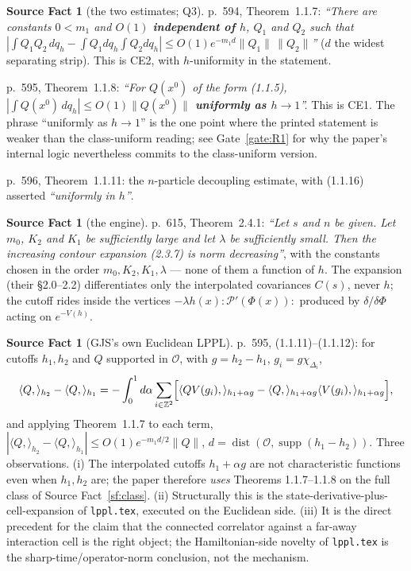 \documentclass[11pt,a4paper]{article}
\theoremstyle{plain}
\theoremstyle{definition}
\newtheorem{srcfact}[theorem]{Source Fact}
\newcommand{\ip}[2]{\langle #1,#2\rangle}
\DeclareMathOperator{\supp}{supp}
\DeclareMathOperator{\dist}{dist}
\begin{document}
\begin{srcfact}[the two estimates; Q3]\label{sf:thms}
p.~594, Theorem~1.1.7: \emph{``There are constants $0<m_1$ and $O(1)$ \textbf{independent of
$h$}, $Q_1$ and $Q_2$ such that
$|\int Q_1Q_2\,dq_h-\int Q_1dq_h\int Q_2dq_h|\le O(1)e^{-m_1d}\|Q_1\|\,\|Q_2\|$''} ($d$ the widest
separating strip). This is CE2, with $h$-uniformity in the statement.

p.~595, Theorem~1.1.8: \emph{``For $Q(x^0)$ of the form (1.1.5),
$|\int Q(x^0)\,dq_h|\le O(1)\|Q(x^0)\|$ \textbf{uniformly as $h\to1$}''.} This is CE1. The
phrase ``uniformly as $h\to1$'' is the one point where the printed statement is weaker than the
class-uniform reading; see Gate~\ref{gate:R1} for why the paper's internal logic nevertheless
commits to the class-uniform version.

p.~596, Theorem~1.1.11: the $n$-particle decoupling estimate, with (1.1.16) asserted
\emph{``uniformly in $h$''}.
\end{srcfact}

\begin{srcfact}[the engine]\label{sf:engine}
p.~615, Theorem~2.4.1: \emph{``Let $s$ and $n$ be given. Let $m_0$, $K_2$ and $K_1$ be
sufficiently large and let $\lambda$ be sufficiently small. Then the increasing contour expansion
(2.3.7) is norm decreasing''}, with the constants chosen in the order $m_0,K_2,K_1,\lambda$ ---
none of them a function of $h$. The expansion (their \S2.0--2.2) differentiates only the
interpolated covariances $C(s)$, never $h$; the cutoff rides inside the vertices
$-\lambda h(x):\mathscr P'(\Phi(x)):$ produced by $\delta/\delta\Phi$ acting on $e^{-V(h)}$.
\end{srcfact}

\begin{srcfact}[GJS's own Euclidean LPPL]\label{sf:lppl}
p.~595, (1.1.11)--(1.1.12): for cutoffs $h_1,h_2$ and $Q$ supported in $\mathcal O$, with
$g=h_2-h_1$, $g_i=g\chi_{\Delta_i}$,
\[
  \ip{Q}{}_{h_2}-\ip{Q}{}_{h_1}
  =-\int_0^1d\alpha\sum_{i\in\mathbb Z^2}
   \Bigl[\ip{QV(g_i)}{}_{h_1+\alpha g}-\ip{Q}{}_{h_1+\alpha g}\ip{V(g_i)}{}_{h_1+\alpha g}\Bigr],
\]
and applying Theorem~1.1.7 to each term,
$|\ip{Q}{}_{h_2}-\ip{Q}{}_{h_1}|\le O(1)e^{-m_1d/2}\|Q\|$, $d=\dist(\mathcal O,\supp(h_1-h_2))$.
Three observations. (i) The interpolated cutoffs $h_1+\alpha g$ are not characteristic functions
even when $h_1,h_2$ are; the paper therefore \emph{uses} Theorems 1.1.7--1.1.8 on the full class
of Source Fact~\ref{sf:class}. (ii) Structurally this is the state-derivative-plus-cell-expansion
of \texttt{lppl.tex}, executed on the Euclidean side. (iii) It is the direct precedent for the
claim that the connected correlator against a far-away interaction cell is the right object; the
Hamiltonian-side novelty of \texttt{lppl.tex} is the sharp-time/operator-norm conclusion, not the
mechanism.
\end{srcfact}
\end{document}
